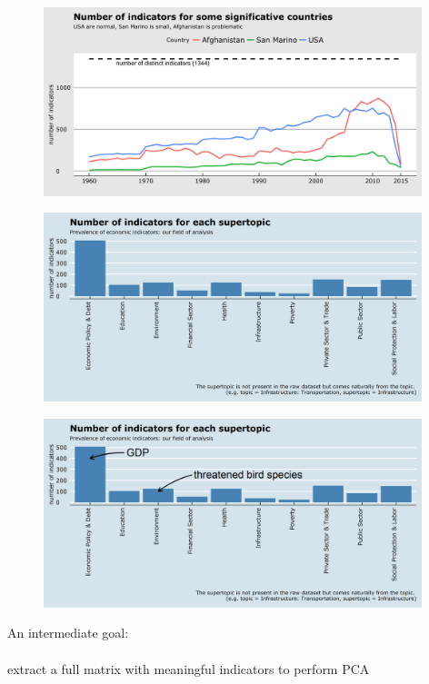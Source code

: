 \documentclass{beamer}
\begin{document}
\begin{frame}
	\begin{figure}
		\centering
		\includegraphics[width=11cm]{plot0002.png}
	\end{figure}
\end{frame}

\begin{frame}
	\begin{figure}
		\centering
		\includegraphics[width=11cm]{plot0003.png}
	\end{figure}
\end{frame}

\begin{frame}
	\begin{figure}
		\centering
		\includegraphics[width=11cm]{plot0004.png}
	\end{figure}
\end{frame}

\begin{frame}
	\begin{center}
		An intermediate goal: 
		\\
		\\
		extract a full matrix with meaningful indicators to perform PCA
	\end{center}
\end{frame}
\end{document}
